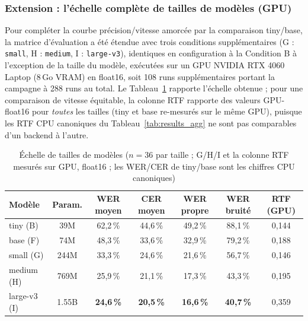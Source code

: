 \documentclass[12pt]{report}
\begin{document}
\subsubsection*{Extension : l'échelle complète de tailles de modèles (GPU)}
Pour compléter la courbe précision/vitesse amorcée par la comparaison tiny/base, la matrice d'évaluation a été étendue avec trois conditions supplémentaires (G : \texttt{small}, H : \texttt{medium}, I : \texttt{large-v3}), identiques en configuration à la Condition B à l'exception de la taille du modèle, exécutées sur un GPU NVIDIA RTX 4060 Laptop (8\,Go VRAM) en float16, soit 108 runs supplémentaires portant la campagne à 288 runs au total. Le Tableau~\ref{tab:ladder} rapporte l'échelle obtenue ; pour une comparaison de vitesse équitable, la colonne RTF rapporte des valeurs GPU-float16 pour \emph{toutes} les tailles (tiny et base re-mesurés sur le même GPU), puisque les RTF CPU canoniques du Tableau~\ref{tab:results_agg} ne sont pas comparables d'un backend à l'autre.
\begin{table}[H]
\centering
\small
\begin{tabular}{|l|c|c|c|c|c|c|}
\hline
\textbf{Modèle} & \textbf{Param.} & \textbf{WER moyen} & \textbf{CER moyen} & \textbf{WER propre} & \textbf{WER bruité} & \textbf{RTF (GPU)} \\ \hline
tiny (B) & 39M & 62,2\,\% & 44,6\,\% & 49,2\,\% & 88,1\,\% & 0,144 \\ \hline
base (F) & 74M & 48,3\,\% & 33,6\,\% & 32,9\,\% & 79,2\,\% & 0,188 \\ \hline
small (G) & 244M & 33,3\,\% & 24,6\,\% & 21,6\,\% & 56,7\,\% & 0,146 \\ \hline
medium (H) & 769M & 25,9\,\% & 21,1\,\% & 17,3\,\% & 43,3\,\% & 0,195 \\ \hline
large-v3 (I) & 1.55B & \textbf{24,6\,\%} & \textbf{20,5\,\%} & \textbf{16,6\,\%} & \textbf{40,7\,\%} & 0,359 \\ \hline
\end{tabular}
\caption{Échelle de tailles de modèles ($n=36$ par taille ; G/H/I et la colonne RTF mesurés sur GPU, float16 ; les WER/CER de tiny/base sont les chiffres CPU canoniques)}
\label{tab:ladder}
\end{table}
\end{document}
